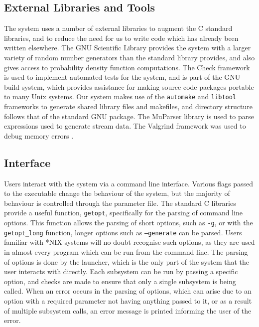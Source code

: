 \documentclass[a4paper,11pt]{article}
\begin{document}
\subsection{External Libraries and Tools}
\label{sec-6-4}

   The system uses a number of external libraries to augment the C standard
   libraries, and to reduce the need for us to write code which has already been
   written elsewhere. The GNU Scientific Library \cite{gsl} provides the system
   with a larger variety of random number generators than the standard library
   provides, and also gives access to probability density function
   computations. The Check framework \cite{check} is used to implement automated
   tests for the system, and is part of the GNU build system, which provides
   assistance for making source code packages portable to many Unix systems. Our
   system makes use of the \texttt{automake} and \texttt{libtool} frameworks to
   generate shared library files and makefiles, and directory structure follows
   that of the standard GNU package. The MuParser library \cite{muparser} is
   used to parse expressions used to generate stream data. The Valgrind
   framework was used to debug memory errors \cite{valgrind}.
\subsection{Interface}
\label{sec-6-5}

   Users interact with the system via a command line interface. Various flags
   passed to the executable change the behaviour of the system, but the majority
   of behaviour is controlled through the parameter file. The standard C
   libraries provide a useful function, \texttt{getopt}, specifically for the
   parsing of command line options. This function allows the parsing of short
   options, such as \texttt{-g}, or with the \texttt{getopt\_long} function,
   longer options such as \texttt{--generate} can be parsed. Users familiar with
   *NIX systems will no doubt recognise such options, as they are used in almost
   every program which can be run from the command line. The parsing of options
   is done by the launcher, which is the only part of the system that the user
   interacts with directly. Each subsystem can be run by passing a specific
   option, and checks are made to ensure that only a single subsystem is being
   called. When an error occurs in the parsing of options, which can arise due
   to an option with a required parameter not having anything passed to it, or
   as a result of multiple subsystem calls, an error message is printed
   informing the user of the error.
   
\end{document}
